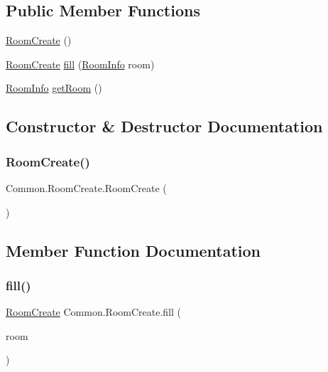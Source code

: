 \subsection*{Public Member Functions}
\begin{DoxyCompactItemize}
\item 
\mbox{\hyperlink{classCommon_1_1RoomCreate_ae06d6c403708490da9bc74396e9cc092}{Room\+Create}} ()
\item 
\mbox{\hyperlink{classCommon_1_1RoomCreate}{Room\+Create}} \mbox{\hyperlink{classCommon_1_1RoomCreate_ab779aabfd5c71281dcd36cf6dbfe4d11}{fill}} (\mbox{\hyperlink{classCommon_1_1RoomInfo}{Room\+Info}} room)
\item 
\mbox{\hyperlink{classCommon_1_1RoomInfo}{Room\+Info}} \mbox{\hyperlink{classCommon_1_1RoomCreate_a4bff6a47b84ef3350987e80977e0f017}{get\+Room}} ()
\end{DoxyCompactItemize}


\subsection{Constructor \& Destructor Documentation}
\mbox{\label{classCommon_1_1RoomCreate_ae06d6c403708490da9bc74396e9cc092}} 
\subsubsection{\texorpdfstring{Room\+Create()}{RoomCreate()}}
{\footnotesize\ttfamily Common.\+Room\+Create.\+Room\+Create (\begin{DoxyParamCaption}{ }\end{DoxyParamCaption})\hspace{0.3cm}{\ttfamily [inline]}}



\subsection{Member Function Documentation}
\mbox{\label{classCommon_1_1RoomCreate_ab779aabfd5c71281dcd36cf6dbfe4d11}} 
\subsubsection{\texorpdfstring{fill()}{fill()}}
{\footnotesize\ttfamily \mbox{\hyperlink{classCommon_1_1RoomCreate}{Room\+Create}} Common.\+Room\+Create.\+fill (\begin{DoxyParamCaption}\item[{\mbox{\hyperlink{classCommon_1_1RoomInfo}{Room\+Info}}}]{room }\end{DoxyParamCaption})\hspace{0.3cm}{\ttfamily [inline]}}

